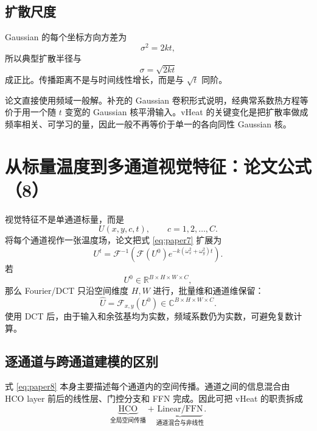 \documentclass[UTF8,12pt,a4paper,fontset=none]{ctexart}
\numberwithin{equation}{section}
\newcommand{\R}{\mathbb{R}}
\newcommand{\F}{\mathcal{F}}
\newcommand{\IFT}{\mathcal{F}^{-1}}
\begin{document}
\subsection{扩散尺度}

Gaussian 的每个坐标方向方差为
\begin{equation}
  \sigma^2=2kt,
\end{equation}
所以典型扩散半径与
\begin{equation}
  \sigma=\sqrt{2kt}
\end{equation}
成正比。传播距离不是与时间线性增长，而是与 $\sqrt{t}$ 同阶。

\begin{notebox}[论文没有显式写出的等价形式]
论文直接使用频域一般解。补充的 Gaussian 卷积形式说明，经典常系数热方程等价于用一个随 $t$ 变宽的 Gaussian 核平滑输入。vHeat 的关键变化是把扩散率做成频率相关、可学习的量，因此一般不再等价于单一的各向同性 Gaussian 核。
\end{notebox}

\section{从标量温度到多通道视觉特征：论文公式（8）}

视觉特征不是单通道标量，而是
\begin{equation}
  U(x,y,c,t),
  \qquad c=1,2,\ldots,C.
\end{equation}
将每个通道视作一张温度场，论文把式 \eqref{eq:paper7} 扩展为
\begin{equation}
  U^t
  =\IFT\left(
  \F(U^0)
  e^{-k(\omega_x^2+\omega_y^2)t}
  \right).
  \tag{8}
  \label{eq:paper8}
\end{equation}
若
\begin{equation}
  U^0\in\R^{B\times H\times W\times C},
\end{equation}
那么 Fourier/DCT 只沿空间维度 $H,W$ 进行，批量维和通道维保留：
\begin{equation}
  \widehat U
  =\F_{x,y}(U^0)
  \in\mathbb{C}^{B\times H\times W\times C}.
\end{equation}
使用 DCT 后，由于输入和余弦基均为实数，频域系数仍为实数，可避免复数计算。

\subsection{逐通道与跨通道建模的区别}

式 \eqref{eq:paper8} 本身主要描述每个通道内的空间传播。通道之间的信息混合由 HCO layer 前后的线性层、门控分支和 FFN 完成。因此可把 vHeat 的职责拆成
\begin{equation}
  \underbrace{\text{HCO}}_{\text{全局空间传播}}
  +
  \underbrace{\text{Linear/FFN}}_{\text{通道混合与非线性}}.
\end{equation}
\end{document}
